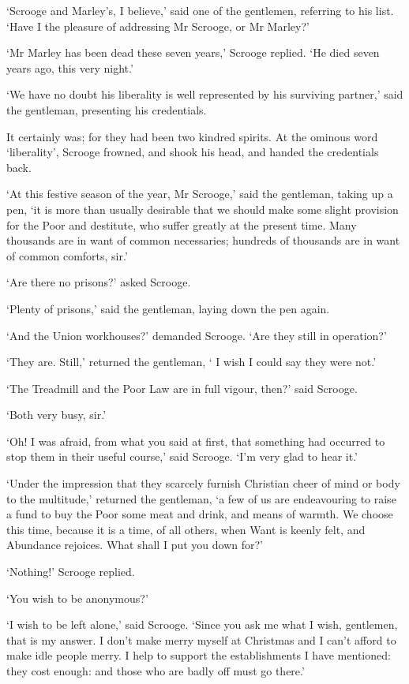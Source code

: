 \documentclass[11pt,twoside]{article}\makeatletter
\begin{document}
‘Scrooge and Marley's, I believe,’ said one of the  gentlemen, referring to his list.  ‘Have I the pleasure of addressing Mr Scrooge, or Mr Marley?’\par
‘Mr Marley has been dead these seven years,’ Scrooge replied. ‘He died seven years ago, this very night.’\par
‘We have no doubt his liberality is well represented by his surviving partner,’ said the gentleman, presenting his credentials.  \par
It certainly was; for they had been two kindred spirits. At the ominous word ‘liberality’, Scrooge frowned, and shook his head, and handed the credentials back.  \par
‘At this festive season of the year, Mr Scrooge,’ said the gentleman, taking up a pen, ‘it is more than usually desirable that we should make some slight provision for the Poor and destitute, who suffer greatly at the present time.  Many thousands are in want of common necessaries; hundreds of thousands are in want of common comforts, sir.’\par
‘Are there no prisons?’ asked Scrooge.  \par
‘Plenty of prisons,’ said the gentleman, laying down the pen again. \par
‘And the Union workhouses?’ demanded Scrooge.  ‘Are they still in operation?’\par
‘They are.  Still,’ returned the gentleman, ‘ I wish I could say they were not.’\par
‘The Treadmill and the Poor Law are in full vigour, then?’ said Scrooge.  \par
‘Both very busy, sir.’\par
‘Oh!  I was afraid, from what you said at first, that something had occurred to stop them in their useful course,’ said Scrooge.  ‘I'm very glad to hear it.’\par
‘Under the impression that they scarcely furnish Christian cheer of mind or body to the multitude,’ returned the gentleman, ‘a few of us are endeavouring to raise a fund to buy the Poor some meat and drink, and means of warmth. We choose this time, because it is a time, of all others, when Want is keenly felt, and Abundance rejoices.  What shall I put you down for?’\par
‘Nothing!’ Scrooge replied.  \par
‘You wish to be anonymous?’\par
‘I wish to be left alone,’ said Scrooge.  ‘Since  you ask me what I wish, gentlemen, that is my answer.  I don't make merry myself at Christmas and I can't afford to make idle people merry.  I help to support the establishments I have mentioned: they cost enough: and those who are badly off must go there.’\par
\end{document}
